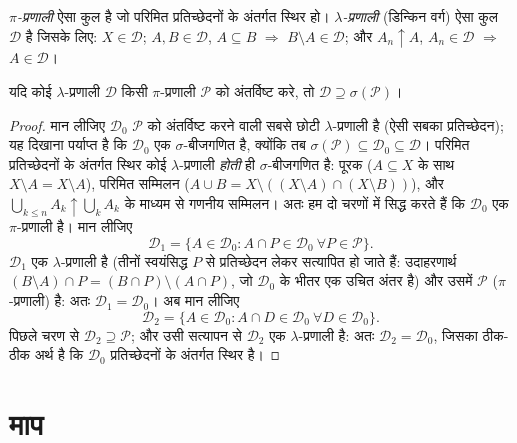 \begin{definition}\label{def:b3:measure:dynkin}
\emph{$\pi$-प्रणाली} ऐसा कुल है जो
परिमित प्रतिच्छेदनों के अंतर्गत स्थिर हो।
\emph{$\lambda$-प्रणाली}
(डिन्किन वर्ग) ऐसा कुल $\mathcal D$ है जिसके लिए: $X \in \mathcal
D$; $A, B \in \mathcal D$, $A \subseteq B$ $\Rightarrow$
$B
\setminus A \in \mathcal D$; और $A_n \uparrow A$, $A_n \in
\mathcal D$ $\Rightarrow$ $A \in \mathcal D$।
\end{definition}

\begin{theorem}[डिन्किन की $\pi$--$\lambda$ प्रमेयिका]
\label{thm:b3:measure:dynkin}
यदि कोई $\lambda$-प्रणाली $\mathcal D$ किसी $\pi$-प्रणाली $\mathcal P$ को अंतर्विष्ट
करे, तो $\mathcal D \supseteq
\sigma(\mathcal P)$।
\end{theorem}

\begin{proof}
मान लीजिए $\mathcal D_0$ $\mathcal P$ को अंतर्विष्ट करने वाली सबसे छोटी
$\lambda$-प्रणाली है (ऐसी सबका प्रतिच्छेदन); यह दिखाना पर्याप्त है कि
$\mathcal D_0$ एक $\sigma$-बीजगणित है, क्योंकि तब $\sigma(\mathcal P) \subseteq \mathcal D_0 \subseteq \mathcal
D$। परिमित प्रतिच्छेदनों के
अंतर्गत स्थिर कोई $\lambda$-प्रणाली \emph{होती} ही $\sigma$-बीजगणित है:
पूरक ($A \subseteq X$ के साथ $X \setminus A = X
\setminus A$), परिमित सम्मिलन ($A \cup B =
X \setminus ((X\setminus A)\cap(X\setminus B))$), और $\bigcup_{k \leq n}A_k \uparrow \bigcup_kA_k$ के
माध्यम से गणनीय सम्मिलन। अतः हम दो चरणों में सिद्ध करते हैं कि
$\mathcal D_0$ एक $\pi$-प्रणाली है। मान लीजिए
\[
\mathcal D_1 = \{A \in \mathcal D_0 : A \cap P \in \mathcal
D_0 \ \forall P \in \mathcal P\}.
\]
$\mathcal D_1$ एक $\lambda$-प्रणाली है (तीनों स्वयंसिद्ध $P$ से प्रतिच्छेदन
लेकर सत्यापित हो जाते हैं: उदाहरणार्थ $(B\setminus A)\cap P
= (B \cap P)\setminus(A \cap P)$, जो $\mathcal D_0$ के भीतर एक
उचित अंतर है) और उसमें $\mathcal P$ ($\pi$-प्रणाली) है: अतः $\mathcal D_1 = \mathcal D_0$। अब मान
लीजिए
\[
\mathcal D_2 = \{A \in \mathcal D_0 : A \cap D \in \mathcal
D_0\ \forall D \in \mathcal D_0\}.
\]
पिछले चरण से $\mathcal D_2 \supseteq \mathcal P$; और उसी सत्यापन से $\mathcal D_2$ एक $\lambda$-प्रणाली है:
अतः $\mathcal D_2 = \mathcal D_0$, जिसका ठीक-ठीक अर्थ है कि $\mathcal D_0$ प्रतिच्छेदनों के अंतर्गत
स्थिर है।
\end{proof}

\section{माप}

